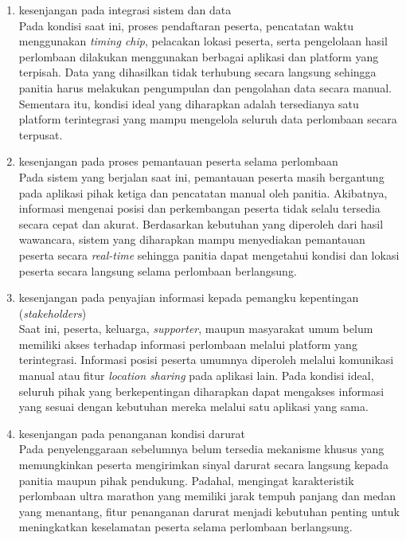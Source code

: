 \begin{enumerate}
    \item kesenjangan pada integrasi sistem dan data \\
    Pada kondisi saat ini, proses pendaftaran peserta, pencatatan waktu menggunakan \textit{timing chip}, pelacakan lokasi peserta, serta pengelolaan hasil perlombaan dilakukan menggunakan berbagai aplikasi dan platform yang terpisah. Data yang dihasilkan tidak terhubung secara langsung sehingga panitia harus melakukan pengumpulan dan pengolahan data secara manual. Sementara itu, kondisi ideal yang diharapkan adalah tersedianya satu platform terintegrasi yang mampu mengelola seluruh data perlombaan secara terpusat.

    \item kesenjangan pada proses pemantauan peserta selama perlombaan \\
    Pada sistem yang berjalan saat ini, pemantauan peserta masih bergantung pada aplikasi pihak ketiga dan pencatatan manual oleh panitia. Akibatnya, informasi mengenai posisi dan perkembangan peserta tidak selalu tersedia secara cepat dan akurat. Berdasarkan kebutuhan yang diperoleh dari hasil wawancara, sistem yang diharapkan mampu menyediakan pemantauan peserta secara \textit{real-time} sehingga panitia dapat mengetahui kondisi dan lokasi peserta secara langsung selama perlombaan berlangsung.

    \item kesenjangan pada penyajian informasi kepada pemangku kepentingan (\textit{stakeholders}) \\
    Saat ini, peserta, keluarga, \textit{supporter}, maupun masyarakat umum belum memiliki akses terhadap informasi perlombaan melalui platform yang terintegrasi. Informasi posisi peserta umumnya diperoleh melalui komunikasi manual atau fitur \textit{location sharing} pada aplikasi lain. Pada kondisi ideal, seluruh pihak yang berkepentingan diharapkan dapat mengakses informasi yang sesuai dengan kebutuhan mereka melalui satu aplikasi yang sama.

    \item kesenjangan pada penanganan kondisi darurat \\
    Pada penyelenggaraan sebelumnya belum tersedia mekanisme khusus yang memungkinkan peserta mengirimkan sinyal darurat secara langsung kepada panitia maupun pihak pendukung. Padahal, mengingat karakteristik perlombaan ultra marathon yang memiliki jarak tempuh panjang dan medan yang menantang, fitur penanganan darurat menjadi kebutuhan penting untuk meningkatkan keselamatan peserta selama perlombaan berlangsung.
\end{enumerate}


